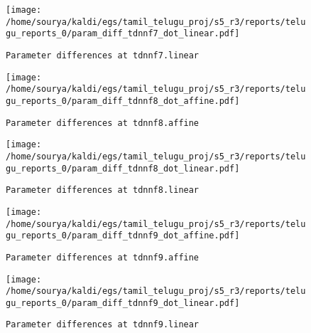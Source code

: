 \documentclass[prl,10pt,twocolumn]{revtex4}
\begin{document}
\newpage
\begin{figure}[h]
  \begin{center}
    \caption{\texttt{Parameter differences at tdnnf7.linear}}
    \texttt{[image: /home/sourya/kaldi/egs/tamil\_telugu\_proj/s5\_r3/reports/telugu\_reports\_0/param\_diff\_tdnnf7\_dot\_linear.pdf]}
  \end{center}
\end{figure}
\clearpage


\newpage
\begin{figure}[h]
  \begin{center}
    \caption{\texttt{Parameter differences at tdnnf8.affine}}
    \texttt{[image: /home/sourya/kaldi/egs/tamil\_telugu\_proj/s5\_r3/reports/telugu\_reports\_0/param\_diff\_tdnnf8\_dot\_affine.pdf]}
  \end{center}
\end{figure}
\clearpage


\newpage
\begin{figure}[h]
  \begin{center}
    \caption{\texttt{Parameter differences at tdnnf8.linear}}
    \texttt{[image: /home/sourya/kaldi/egs/tamil\_telugu\_proj/s5\_r3/reports/telugu\_reports\_0/param\_diff\_tdnnf8\_dot\_linear.pdf]}
  \end{center}
\end{figure}
\clearpage


\newpage
\begin{figure}[h]
  \begin{center}
    \caption{\texttt{Parameter differences at tdnnf9.affine}}
    \texttt{[image: /home/sourya/kaldi/egs/tamil\_telugu\_proj/s5\_r3/reports/telugu\_reports\_0/param\_diff\_tdnnf9\_dot\_affine.pdf]}
  \end{center}
\end{figure}
\clearpage


\newpage
\begin{figure}[h]
  \begin{center}
    \caption{\texttt{Parameter differences at tdnnf9.linear}}
    \texttt{[image: /home/sourya/kaldi/egs/tamil\_telugu\_proj/s5\_r3/reports/telugu\_reports\_0/param\_diff\_tdnnf9\_dot\_linear.pdf]}
  \end{center}
\end{figure}
\clearpage
\end{document}

